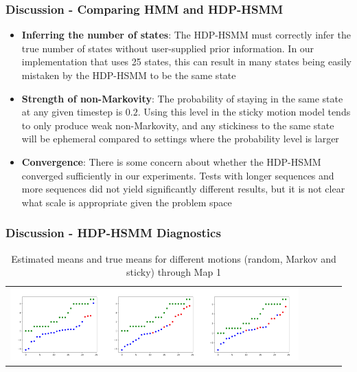 \documentclass{beamer}
\begin{document}
\begin{frame}
	\frametitle{Discussion - Comparing HMM and HDP-HSMM}
    \begin{itemize}
      \item \textbf{Inferring the number of states}: The HDP-HSMM must correctly infer the true number of states without user-supplied prior information. In our implementation that uses 25 states, this can result in many states being easily mistaken by the HDP-HSMM to be the same state
      \item \textbf{Strength of non-Markovity}: The probability of staying in the same state at any given timestep is $0.2$. Using this level in the sticky motion model tends to only produce weak non-Markovity, and any stickiness to the same state will be ephemeral compared to settings where the probability level is larger
      \item \textbf{Convergence}: There is some concern about whether the HDP-HSMM converged sufficiently in our experiments. Tests with longer sequences and more sequences did not yield significantly different results, but it is not clear what scale is appropriate given the problem space
    \end{itemize}
\end{frame}

\begin{frame}
    \frametitle{Discussion - HDP-HSMM Diagnostics}
    \newcommand{\addrandommeana}{\includegraphics[width=10em]{images/hdphsmm/random-m1-means.png}}
    \newcommand{\addmarkovmeana}{\includegraphics[width=10em]{images/hdphsmm/markov-m1-means.png}}
    \newcommand{\addcorrmeana}{\includegraphics[width=10em]{images/hdphsmm/corr-m1-means.png}}
    \begin{table}[H]
    \sffamily
    \centering
    \begin{tabular}{l*4{C}@{}}
    \addrandommeana \addmarkovmeana \addcorrmeana \\
    \end{tabular}
    \caption{Estimated means and true means for different motions (random, Markov and sticky) through Map 1}
    \label{table:meaninfer}
    \end{table}
\end{frame}
\end{document}
